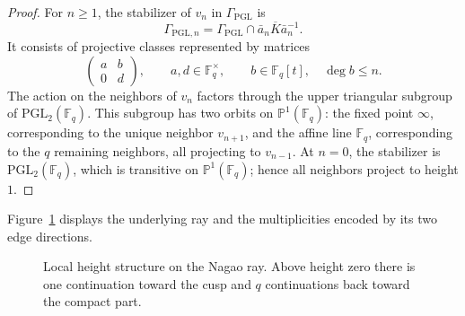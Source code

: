 \documentclass[11pt]{amsart}
\theoremstyle{definition}
\theoremstyle{plain}
\newcommand{\Fq}{\mathbb F_q}
\newcommand{\GammaP}{\Gamma_{\mathrm{PGL}}}
\newcommand{\bK}{\overline K}
\begin{document}
\begin{proof}
For \(n\ge1\), the stabilizer of \(v_n\) in \(\GammaP\) is
\[
\Gamma_{\mathrm{PGL},n}=\GammaP\cap \bar a_n\bK\bar a_n^{-1}.
\]
It consists of projective classes represented by matrices
\[
\begin{pmatrix}a&b\\0&d\end{pmatrix},
\qquad a,d\in\Fq^\times,
\qquad b\in\Fq[t],\quad \deg b\le n.
\]
The action on the neighbors of \(v_n\) factors through the upper triangular
subgroup of \(\mathrm{PGL}_2(\Fq)\).  This subgroup has two orbits on
\(\mathbb P^1(\Fq)\): the fixed point \(\infty\), corresponding to the unique
neighbor \(v_{n+1}\), and the affine line \(\Fq\), corresponding to the \(q\)
remaining neighbors, all projecting to \(v_{n-1}\).  At \(n=0\), the stabilizer is
\(\mathrm{PGL}_2(\Fq)\), which is transitive on \(\mathbb P^1(\Fq)\); hence all
neighbors project to height \(1\).
\end{proof}

Figure~\ref{fig:local-height} displays the underlying ray and the multiplicities
encoded by its two edge directions.

\begin{figure}[ht]
\centering
{}
\caption{Local height structure on the Nagao ray.  Above height zero there is one continuation toward the cusp and \(q\) continuations back toward the compact part.}
\label{fig:local-height}
\end{figure}
\end{document}
